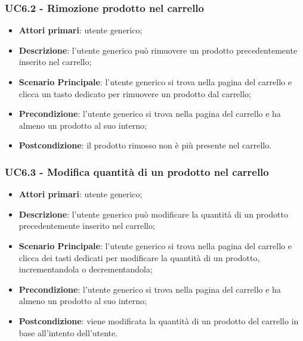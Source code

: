 \subsubsection{UC6.2 - Rimozione prodotto nel carrello}
\begin{itemize}
\item \textbf{Attori primari}: utente generico;
\item \textbf{Descrizione}: l'utente generico può rimuovere un prodotto precedentemente inserito nel carrello;
\item \textbf{Scenario Principale}: l'utente generico si trova nella pagina del carrello e clicca un tasto dedicato per rimuovere un prodotto dal carrello;
\item \textbf{Precondizione}: l'utente generico si trova nella pagina del carrello e ha almeno un prodotto al suo interno;
\item \textbf{Postcondizione}: il prodotto rimosso non è più presente nel carrello.
\end{itemize}

\subsubsection{UC6.3 - Modifica quantità di un prodotto nel carrello}
\begin{itemize}
\item \textbf{Attori primari}: utente generico;
\item \textbf{Descrizione}: l'utente generico può modificare la quantità di un prodotto precedentemente inserito nel carrello;
\item \textbf{Scenario Principale}: l'utente generico si trova nella pagina del carrello e clicca dei tasti dedicati per modificare la quantità di un prodotto, incrementandola o decrementandola;
\item \textbf{Precondizione}: l'utente generico si trova nella pagina del carrello e ha almeno un prodotto al suo interno;
\item \textbf{Postcondizione}: viene modificata la quantità di un prodotto del carrello in base all'intento dell'utente.
\end{itemize}

